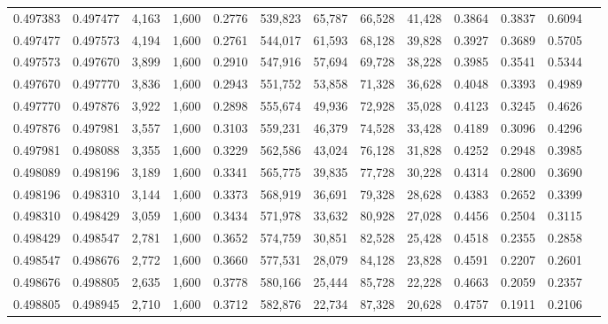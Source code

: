 \begin{tabular}{rrrrrrrrrrrrr}
0.497383 & 0.497477 &  4,163 & 1,600 &                                     0.2776 & 539,823 &  65,787 &  66,528 &  41,428 & 0.3864 & 0.3837 & 0.6094 \\
0.497477 & 0.497573 &  4,194 & 1,600 &                                     0.2761 & 544,017 &  61,593 &  68,128 &  39,828 & 0.3927 & 0.3689 & 0.5705 \\
0.497573 & 0.497670 &  3,899 & 1,600 &                                     0.2910 & 547,916 &  57,694 &  69,728 &  38,228 & 0.3985 & 0.3541 & 0.5344 \\
0.497670 & 0.497770 &  3,836 & 1,600 &                                     0.2943 & 551,752 &  53,858 &  71,328 &  36,628 & 0.4048 & 0.3393 & 0.4989 \\
0.497770 & 0.497876 &  3,922 & 1,600 &                                     0.2898 & 555,674 &  49,936 &  72,928 &  35,028 & 0.4123 & 0.3245 & 0.4626 \\
0.497876 & 0.497981 &  3,557 & 1,600 &                                     0.3103 & 559,231 &  46,379 &  74,528 &  33,428 & 0.4189 & 0.3096 & 0.4296 \\
0.497981 & 0.498088 &  3,355 & 1,600 &                                     0.3229 & 562,586 &  43,024 &  76,128 &  31,828 & 0.4252 & 0.2948 & 0.3985 \\
0.498089 & 0.498196 &  3,189 & 1,600 &                                     0.3341 & 565,775 &  39,835 &  77,728 &  30,228 & 0.4314 & 0.2800 & 0.3690 \\
0.498196 & 0.498310 &  3,144 & 1,600 &                                     0.3373 & 568,919 &  36,691 &  79,328 &  28,628 & 0.4383 & 0.2652 & 0.3399 \\
0.498310 & 0.498429 &  3,059 & 1,600 &                                     0.3434 & 571,978 &  33,632 &  80,928 &  27,028 & 0.4456 & 0.2504 & 0.3115 \\
0.498429 & 0.498547 &  2,781 & 1,600 &                                     0.3652 & 574,759 &  30,851 &  82,528 &  25,428 & 0.4518 & 0.2355 & 0.2858 \\
0.498547 & 0.498676 &  2,772 & 1,600 &                                     0.3660 & 577,531 &  28,079 &  84,128 &  23,828 & 0.4591 & 0.2207 & 0.2601 \\
0.498676 & 0.498805 &  2,635 & 1,600 &                                     0.3778 & 580,166 &  25,444 &  85,728 &  22,228 & 0.4663 & 0.2059 & 0.2357 \\
0.498805 & 0.498945 &  2,710 & 1,600 &                                     0.3712 & 582,876 &  22,734 &  87,328 &  20,628 & 0.4757 & 0.1911 & 0.2106 \\

\end{tabular}
